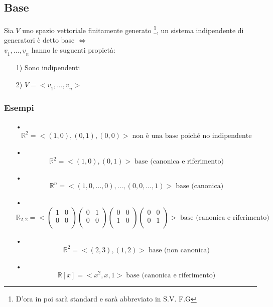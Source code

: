 \subsection{Base}
Sia $V$ uno spazio vettoriale finitamente generato \footnote{D'ora in poi sarà standard e sarà abbreviato in S.V. F.G}, un sistema indipendente di generatori è detto base $\Leftrightarrow$ \\
$\underline{v}_1,...,\underline{v}_n$ hanno le suguenti propietà:
\begin{itemize}
\item[1)] Sono indipendenti
\item[2)] $ V = < \underline{v}_1,...,\underline{v}_n > $
\end{itemize}

\subsubsection{Esempi}

\begin{itemize}
\item[•] $$ \mathbb{R}^2 = < (1,0),(0,1),(0,0) > \; \text{non è una base poiché no indipendente}$$
\item[•] $$ \mathbb{R}^2 =  < (1,0),(0,1) > \; \text{base (canonica e riferimento)} $$
\item[•] $$ \mathbb{R}^n =  < (1,0,...,0),...,(0,0,...,1) > \; \text{base (canonica)} $$
\item[•] $$ \mathbb{R}_{2,2} =  < \begin{pmatrix}
1 & 0 \\
0 & 0 \\
\end{pmatrix}
\begin{pmatrix}
0 & 1 \\
0 & 0 \\
\end{pmatrix}
\begin{pmatrix}
0 & 0 \\
1 & 0 \\
\end{pmatrix}
\begin{pmatrix}
0 & 0 \\
0 & 1 \\
\end{pmatrix} > \; \text{base (canonica e riferimento)} $$
\item[•] $$ \mathbb{R}^2  = < (2,3),(1,2) > \; \text{base (non canonica)} $$
\item[•] $$ \mathbb{R}[x] = <x^2,x,1> \; \text{base (canonica e riferimento)} $$
\end{itemize}

